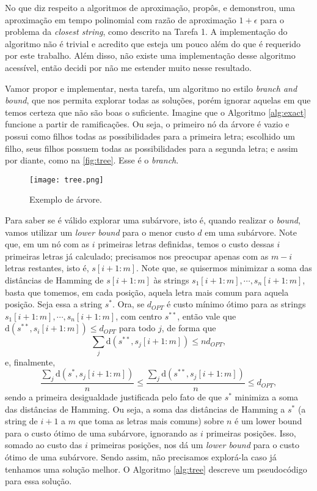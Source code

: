 No que diz respeito a algoritmos de aproximação, \cite{li2002closest} propôs, e demonstrou, uma aproximação em tempo polinomial com razão de aproximação $1 + \epsilon$ para o problema da \textit{closest string}, como descrito na Tarefa 1.
A implementação do algoritmo não é trivial e acredito que esteja um pouco além do que é requerido por este trabalho. Além disso, não existe uma implementação desse algoritmo acessível, então decidi por não me estender muito nesse resultado.

Vamor propor e implementar, nesta tarefa, um algoritmo no estilo \textit{branch and bound}, que nos permita explorar todas as soluções, porém ignorar aquelas em que temos certeza que não são boas o suficiente. Imagine que o Algoritmo \ref{alg:exact} funcione a partir de ramificações. Ou seja, o primeiro nó da árvore é vazio e possui como filhos todas as possibilidades para a primeira letra; escolhido um filho, seus filhos possuem todas as possibilidades para a segunda letra; e assim por diante, como na \autoref{fig:tree}. Esse é o \textit{branch}.

\begin{figure}[H]
    \centering
    \texttt{[image: tree.png]}
    \caption{Exemplo de árvore.}
    \label{fig:tree}
\end{figure}

Para saber se é válido explorar uma subárvore, isto é, quando realizar o \textit{bound}, vamos utilizar um \textit{lower bound} para o menor custo $d$ em uma subárvore. Note que, em um nó com as $i$ primeiras letras definidas, temos o custo dessas $i$ primeiras letras já calculado; precisamos nos preocupar apenas com as $m-i$ letras restantes, isto é, $s[i+1:m]$. Note que, se quisermos minimizar a soma das distâncias de Hamming de $s[i+1:m]$ às strings $s_1[i+1:m], \cdots, s_n[i+1:m]$, basta que tomemos, em cada posição, aquela letra mais comum para aquela posição. Seja essa a string $s^\ast$. Ora, se $d_{OPT}$ é custo mínimo ótimo para as strings $s_1[i+1:m], \cdots, s_n[i+1:m]$, com centro $s^{\ast\ast}$, então vale que $\text{d}(s^{\ast\ast}, s_i[i+1:m]) \le d_{OPT}$ para todo $j$, de forma que
\[\sum_j \text{d}(s^{\ast\ast}, s_j[i+1:m]) \le n d_{OPT},\]
e, finalmente,
\[\frac{\sum_j \text{d}(s^{\ast}, s_j[i+1:m])}{n} \le \frac{\sum_j \text{d}(s^{\ast\ast}, s_j[i+1:m])}{n} \le d_{OPT},\]
sendo a primeira desigualdade justificada pelo fato de que $s^\ast$ minimiza a soma das distâncias de Hamming.
Ou seja, a soma das distâncias de Hamming a $s^\ast$ (a string de $i+1$ a $m$ que toma as letras mais comuns) sobre $n$ é um lower bound para o custo ótimo de uma subárvore, ignorando as $i$ primeiras posições. Isso, somado ao custo das $i$ primeiras posições, nos dá um \textit{lower bound} para o custo ótimo de uma subárvore. Sendo assim, não precisamos explorá-la caso já tenhamos uma solução melhor.
O Algoritmo \ref{alg:tree} descreve um pseudocódigo para essa solução.

